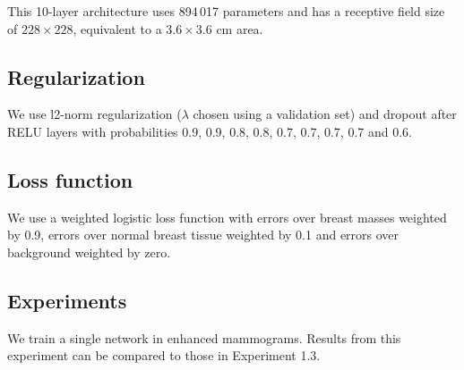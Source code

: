 This 10-layer architecture uses 894\,017 parameters and has a receptive field size of $228 \times 228$, equivalent to a $3.6 \times 3.6$ cm area.
	
\subsection{Regularization}
We use l2-norm regularization ($\lambda$ chosen using a validation set) and dropout after RELU layers with probabilities 0.9, 0.9, 0.8, 0.8, 0.7, 0.7, 0.7, 0.7 and 0.6.

\subsection{Loss function}
We use a weighted logistic loss function with errors over breast masses weighted by 0.9, errors over normal breast tissue weighted by 0.1 and errors over background weighted by zero. 

\subsection{Experiments}
We train a single network in enhanced mammograms. Results from this experiment can be compared to those in Experiment 1.3.
